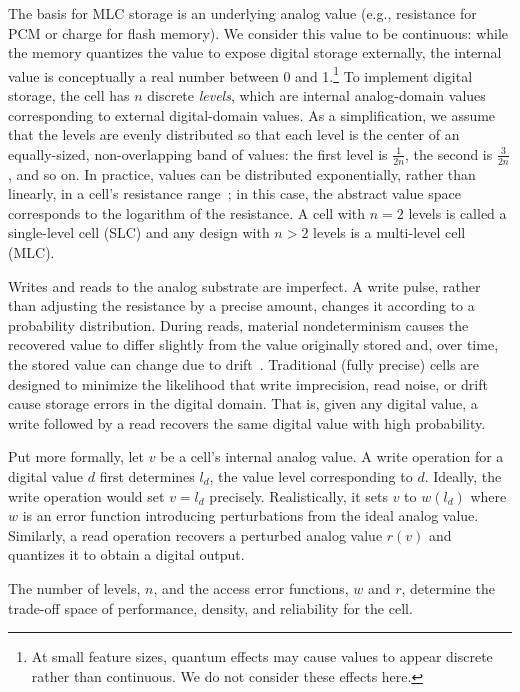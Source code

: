 The basis for MLC storage is an underlying analog value (e.g., resistance for
PCM or charge for flash memory).
We consider this value to be
continuous: while the memory quantizes the value to expose digital
storage externally, the internal value is conceptually
a real number between 0 and 1.\footnote{At small feature sizes, quantum effects may
cause values to appear discrete rather than
continuous. We do not consider these effects here.}
To implement
digital storage, the cell has $n$ discrete \emph{levels}, which are
internal analog-domain values corresponding to
external digital-domain values. As a simplification, we
assume that the levels are evenly distributed so that each level is
the center of an equally-sized, non-overlapping band of values: the
first level is $\frac{1}{2n}$, the second is $\frac{3}{2n}$, and so
on. In practice, values can be distributed exponentially, rather
    than linearly, in a cell's resistance range~\cite{mlcibm,partialreset}; in this case, the abstract value space corresponds
to the logarithm of the resistance. A cell with $n=2$ levels is
called a single-level cell (SLC) and any design with $n
> 2$ levels is a multi-level cell (MLC).

Writes and reads to the analog substrate are imperfect. A write
pulse, rather than adjusting the resistance by a precise amount,
changes it according to a probability distribution. During
reads, material nondeterminism causes the recovered value to differ
slightly from the value originally stored and, over time, the stored
value can change due to drift~\cite{wdddmlcpcm}.
Traditional (fully precise) cells are designed to minimize the
likelihood that write imprecision, read noise, or drift cause storage
errors in the digital domain. That is, given any digital value, a
write followed by a read recovers the same digital value with
high probability.

Put more formally, let $v$ be a cell's internal analog value. A
write operation for a digital value $d$ first determines
$l_d$, the value level corresponding to
$d$. Ideally, the write operation would set $v = l_d$ precisely.
Realistically, it sets $v$ to $w(l_d)$ where $w$ is an error
function introducing perturbations from the ideal analog value.
Similarly, a read operation recovers a perturbed analog value $r(v)$ and
quantizes it to obtain a digital output.

The number of levels, $n$, and the access error functions, $w$ and
$r$, determine the trade-off space of performance, density, and reliability
for the cell.

